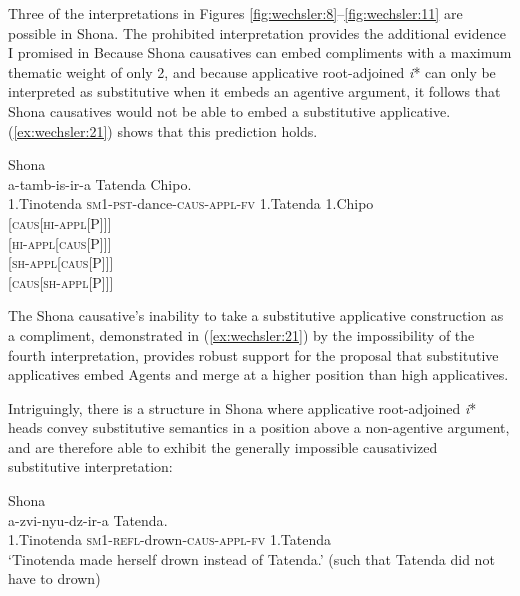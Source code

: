 \documentclass[output=paper,modfonts,nonflat,colorlinks,citecolor=brown]{langsci/langscibook}
\begin{document}
Three of the interpretations in Figures \ref{fig:wechsler:8}--\ref{fig:wechsler:11} are possible in Shona. The prohibited interpretation provides the additional evidence I promised in  Because Shona causatives can embed compliments with a maximum thematic weight of only 2, and because applicative root-adjoined \textit{i}* can only be interpreted as substitutive when it embeds an agentive argument, it follows that Shona causatives would not be able to embed a substitutive applicative. (\ref{ex:wechsler:21}) shows that this prediction holds.


\ea\label{ex:wechsler:21}
Shona\\
  {a-tamb-is-ir-a}                                                                      {Tatenda} {Chipo}.\\
1.Tinotenda  \textsc{sm1-pst}{}-dance-\textsc{caus-appl-fv}  1.Tatenda  1.Chipo\\

   \textsc{[caus[hi-appl[\liv P]]]}\\
  \textsc{[hi-appl[caus[\liv P]]]}\\
  \textsc{[sh-appl[caus[\liv P]]]}\\
  {\textsc{[caus[sh-appl[\liv P]]]}}\\
\z


The Shona causative’s inability to take a substitutive applicative construction as a compliment, demonstrated in (\ref{ex:wechsler:21}) by the impossibility of the fourth interpretation, provides robust support for the proposal that substitutive applicatives embed Agents and merge at a higher position than high applicatives.



Intriguingly, there is a structure in Shona where applicative root-adjoined \textit{i}* heads convey substitutive semantics in a position above a non-agentive argument, and are therefore able to exhibit the generally impossible causativized substitutive interpretation:


\ea\label{ex:wechsler:22}
Shona\\
  {a-zvi-nyu-dz-ir-a} {Tatenda}.\\
1.Tinotenda  \textsc{sm1-refl-}drown\textsc{{}-caus-appl-fv}  1.Tatenda\\
\glt ‘Tinotenda made herself drown instead of Tatenda.'
(such that Tatenda did not have to drown)\\
\z
\end{document}
